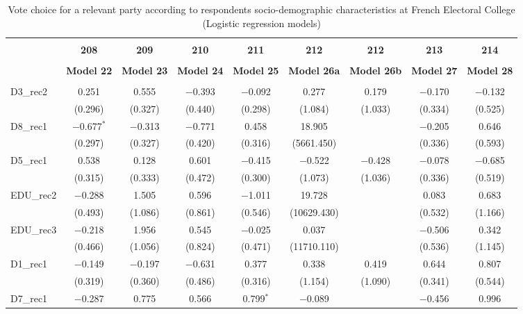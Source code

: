 \documentclass[
]{article}
\begin{document}
\begin{table}[!htbp] \centering 
  \caption{Vote choice for a relevant party according to respondents 
                       socio-demographic characteristics at French Electoral College (Logistic regression models)} 
  \label{table:full_logit_be_fr} 
\footnotesize 
\begin{tabular}{@{\extracolsep{0.5pt}}lcccccccc} 
\\[-1.8ex]\hline \\[-1.8ex] 
 & \textbf{208} & \textbf{209} & \textbf{210} & \textbf{211} & \textbf{212} & \textbf{212} & \textbf{213} & \textbf{214} \\ 
\\[-1.8ex] & \textbf{Model 22} & \textbf{Model 23} & \textbf{Model 24} & \textbf{Model 25} & \textbf{Model 26a} & \textbf{Model 26b} & \textbf{Model 27} & \textbf{Model 28}\\ 
\hline \\[-1.8ex] 
 D3\_rec2 & 0.251 & 0.555 & $-$0.393 & $-$0.092 & 0.277 & 0.179 & $-$0.170 & $-$0.132 \\ 
  & (0.296) & (0.327) & (0.440) & (0.298) & (1.084) & (1.033) & (0.334) & (0.525) \\ 
  D8\_rec1 & $-$0.677$^{*}$ & $-$0.313 & $-$0.771 & 0.458 & 18.905 &  & $-$0.205 & 0.646 \\ 
  & (0.297) & (0.327) & (0.420) & (0.316) & (5661.450) &  & (0.336) & (0.593) \\ 
  D5\_rec1 & 0.538 & 0.128 & 0.601 & $-$0.415 & $-$0.522 & $-$0.428 & $-$0.078 & $-$0.685 \\ 
  & (0.315) & (0.333) & (0.472) & (0.300) & (1.073) & (1.036) & (0.336) & (0.519) \\ 
  EDU\_rec2 & $-$0.288 & 1.505 & 0.596 & $-$1.011 & 19.728 &  & 0.083 & 0.683 \\ 
  & (0.493) & (1.086) & (0.861) & (0.546) & (10629.430) &  & (0.532) & (1.166) \\ 
  EDU\_rec3 & $-$0.218 & 1.956 & 0.545 & $-$0.025 & 0.037 &  & $-$0.506 & 0.342 \\ 
  & (0.466) & (1.056) & (0.824) & (0.471) & (11710.110) &  & (0.536) & (1.145) \\ 
  D1\_rec1 & $-$0.149 & $-$0.197 & $-$0.631 & 0.377 & 0.338 & 0.419 & 0.644 & 0.807 \\ 
  & (0.319) & (0.360) & (0.486) & (0.316) & (1.154) & (1.090) & (0.341) & (0.544) \\ 
  D7\_rec1 & $-$0.287 & 0.775 & 0.566 & 0.799$^{*}$ & $-$0.089 &  & $-$0.456 & 0.996 \\ 

\end{tabular}
\end{table}
\end{document}
